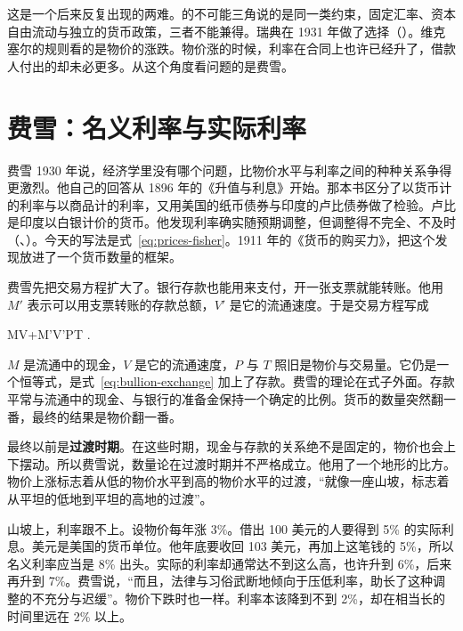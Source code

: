 这是一个后来反复出现的两难。的不可能三角说的是同一类约束，固定汇率、资本自由流动与独立的货币政策，三者不能兼得。瑞典在 1931 年做了选择（）。维克塞尔的规则看的是物价的涨跌。物价涨的时候，利率在合同上也许已经升了，借款人付出的却未必更多。从这个角度看问题的是费雪。

\section{费雪：名义利率与实际利率}\label{sec:wicksell-fisher}

费雪 1930 年说，经济学里没有哪个问题，比物价水平与利率之间的种种关系争得更激烈\cite{fisher1930}。他自己的回答从 1896 年的《升值与利息》开始。那本书区分了以货币计的利率与以商品计的利率，又用美国的纸币债券与印度的卢比债券做了检验。卢比是印度以白银计价的货币。他发现利率确实随预期调整，但调整得不完全、不及时（、）。今天的写法是式~\eqref{eq:prices-fisher}。1911 年的《货币的购买力》，把这个发现放进了一个货币数量的框架。

费雪先把交易方程扩大了。银行存款也能用来支付，开一张支票就能转账。他用 $M'$ 表示可以用支票转账的存款总额，$V'$ 是它的流通速度\cite{fisher1911}。于是交易方程写成
\begin{keyeq}
MV+M'V'\equiv PT .\label{eq:wicksell-exchange}
\end{keyeq}
$M$ 是流通中的现金，$V$ 是它的流通速度，$P$ 与 $T$ 照旧是物价与交易量\cite{fisher1911}。它仍是一个恒等式，是式~\eqref{eq:bullion-exchange} 加上了存款。费雪的理论在式子外面。存款平常与流通中的现金、与银行的准备金保持一个确定的比例\cite{fisher1911}。货币的数量突然翻一番，最终的结果是物价翻一番\cite{fisher1911}。

最终以前是\textbf{过渡时期}。在这些时期，现金与存款的关系绝不是固定的，物价也会上下摆动\cite{fisher1911}。所以费雪说，数量论在过渡时期并不严格成立\cite{fisher1911}。他用了一个地形的比方。物价上涨标志着从低的物价水平到高的物价水平的过渡，“就像一座山坡，标志着从平坦的低地到平坦的高地的过渡”\cite{fisher1911}。

山坡上，利率跟不上。设物价每年涨 3\%。借出 100 美元的人要得到 5\% 的实际利息\cite{fisher1911}。美元是美国的货币单位。他年底要收回 103 美元，再加上这笔钱的 5\%，所以名义利率应当是 8\% 出头\cite{fisher1911}。实际的利率却通常达不到这么高，也许升到 6\%，后来再升到 7\%\cite{fisher1911}。费雪说，“而且，法律与习俗武断地倾向于压低利率，助长了这种调整的不充分与迟缓”\cite{fisher1911}。物价下跌时也一样。利率本该降到不到 2\%，却在相当长的时间里远在 2\% 以上\cite{fisher1911}。

